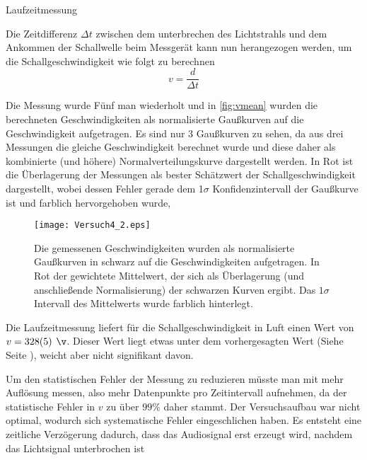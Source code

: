 \documentclass{alex_gp}
\begin{document}
\begin{mybox}{Laufzeitmessung}

	Die Zeitdifferenz \( \Delta t \) zwischen dem unterbrechen des Lichtstrahls und dem Ankommen der Schallwelle beim Messgerät kann nun herangezogen werden, um die Schallgeschwindigkeit wie folgt zu berechnen
	\begin{equation}\label{eqn:v1}
		v = \frac{d}{\Delta t}
	\end{equation}

	Die Messung wurde Fünf man wiederholt und in \autoref{fig:vmean} wurden die berechneten Geschwindigkeiten als normalisierte Gaußkurven auf die Geschwindigkeit aufgetragen. Es sind nur 3 Gaußkurven zu sehen, da aus drei Messungen die gleiche Geschwindigkeit berechnet wurde und diese daher als kombinierte (und höhere) Normalverteilungskurve dargestellt werden. In Rot ist die Überlagerung der Messungen als bester Schätzwert der Schallgeschwindigkeit dargestellt, wobei dessen Fehler gerade dem 1$\sigma$ Konfidenzintervall der Gaußkurve ist und farblich hervorgehoben wurde,
	\begin{figure}[H]	
		\centering
		\texttt{[image: Versuch4\_2.eps]}
		\caption{Die gemessenen Geschwindigkeiten wurden als normalisierte Gaußkurven in schwarz auf die Geschwindigkeiten aufgetragen. In Rot der gewichtete Mittelwert, der sich als Überlagerung (und anschließende Normalisierung) der schwarzen Kurven ergibt. Das \( 1\sigma \) Intervall des Mittelwerts wurde farblich hinterlegt.}
		\label{fig:vmean}
	\end{figure}

	Die Laufzeitmessung liefert für die Schallgeschwindigkeit in Luft einen Wert von \( v = 328(5) \unit{\v} \). Dieser Wert liegt etwas unter dem vorhergesagten Wert (Siehe Seite \pageref{eqn:cad}), weicht aber nicht signifikant davon. 
	
	Um den statistischen Fehler der Messung zu reduzieren müsste man mit mehr Auflösung messen, also mehr Datenpunkte pro Zeitintervall aufnehmen, da der statistische Fehler in \( v \) zu über \( 99 \% \) daher stammt. Der Versuchsaufbau war nicht optimal, wodurch sich systematische Fehler eingeschlichen haben. Es entsteht eine zeitliche Verzögerung dadurch, dass das Audiosignal erst erzeugt wird, nachdem das Lichtsignal unterbrochen ist
\end{mybox}
\end{document}
